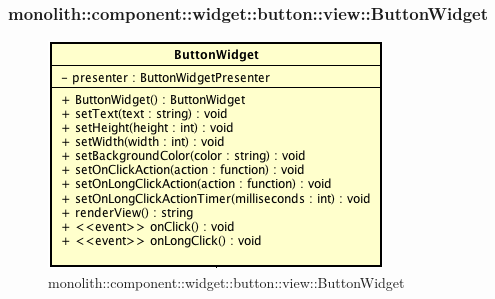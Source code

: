 \subsubsection{monolith::component::widget::button::view::ButtonWidget}

\label{monolith::component::widget::button::view::ButtonWidget}
\begin{figure}[H]
	\centering
	\includegraphics[scale=0.5]{Sezioni/SottosezioniST/img/ButtonWidget.png}
	\caption{monolith::component::widget::button::view::ButtonWidget}
\end{figure}

